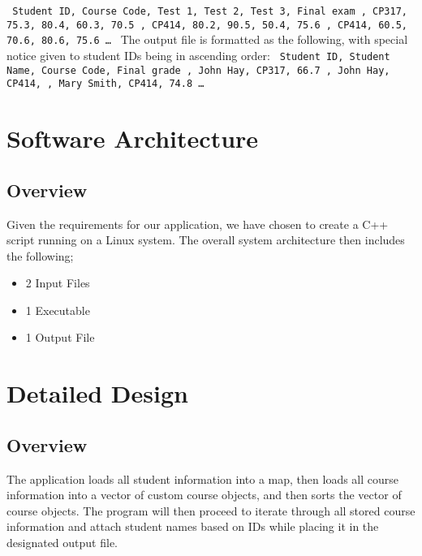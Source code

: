 \documentclass{article}
\begin{document}
\texttt{  \newline
  Student ID, Course Code, Test 1, Test 2, Test 3, Final exam , CP317, 75.3, 80.4, 60.3, 70.5 , CP414, 80.2, 90.5, 50.4, 75.6 , CP414, 60.5, 70.6, 80.6, 75.6 \newline
  \ldots
}
\newline \newline
The output file is formatted as the following, with special notice given to student IDs being in ascending order:
\texttt{  \newline
  Student ID, Student Name, Course Code, Final grade , John Hay, CP317, 66.7 , John Hay, CP414, , Mary Smith, CP414, 74.8 \newline
  \ldots
}

\section{Software Architecture}
\subsection{Overview}
Given the requirements for our application, we have chosen to create a C++ script running on a Linux system.
The overall system architecture then includes the following; 
\begin{itemize}
\item 2 Input Files
\item 1 Executable
\item 1 Output File
\end{itemize}

\section{Detailed Design}
\subsection{Overview}
The application loads all student information into a map, then loads all course information into a vector of custom course objects, and then sorts the vector of course objects. The program will then proceed to iterate through all stored course information and attach student names based on IDs while placing it in the designated output file.
\end{document}
